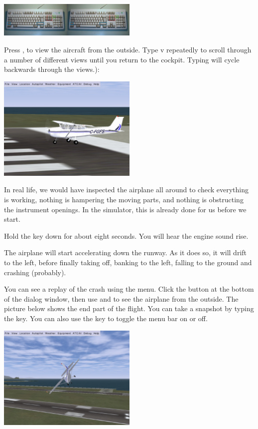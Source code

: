 \begin{center}
\includegraphics[width=0.5\textwidth]{img/tut_7}
\end{center}

Press , to view the aircraft from the outside. Type v repeatedly to
scroll through a number of different views until you return to the cockpit.
Typing  will cycle backwards through the views.):

\begin{center}
\includegraphics[width=0.5\textwidth]{img/tut_8}
\end{center}

In real life, we would have inspected the airplane all around to check 
everything is working, nothing is hampering the moving parts, 
and nothing is obstructing the instrument openings. In the simulator, this is
already done for us before we start.

Hold the  key down for about eight seconds. You will
hear the engine sound rise.

The airplane will start accelerating down the runway. As it does so, it will 
drift to the left, before finally taking off, banking to the left, 
falling to the ground and crashing (probably). 

You can see a replay of the crash using the  
menu. Click the  button at the bottom of the dialog window, then
use  and  to see the airplane from the outside. The
picture below shows the end part of the flight. You can take a snapshot by
typing the  key. 
You can also use the  key to toggle the menu bar on or off.

\begin{center}
\includegraphics[width=0.5\textwidth]{img/tut_9}
\end{center}

